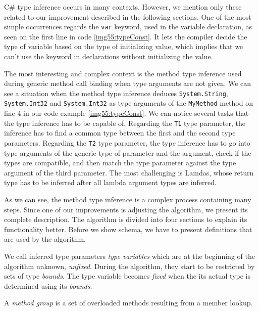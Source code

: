 C\# type inference occurs in many contexts. 
However, we mention only these related to our improvement described in the following sections. 
One of the most simple occurrences regards the \texttt{var} keyword, used in the variable declaration, as seen on the first line in code \ref{img55:typeConst}. It lets the compiler decide the type of variable based on the type of initializing value, which implies that we can’t use the keyword in declarations without initializing the value.
\par
The most interesting and complex context is the method type inference used during generic method call binding when type arguments are not given. 
We can see a situation when the method type inference deduces \texttt{System.String}, \texttt{System.Int32} and \texttt{System.Int32} as type arguments of the \texttt{MyMethod} method on line 4 in our code example \ref{img55:typeConst}. 
We can notice several tasks that the type inference has to be capable of.
Regarding the \texttt{T1} type parameter, the inference has to find a common type between the first and the second type parameters. 
Regarding the \texttt{T2} type parameter, the type inference has to go into type arguments of the generic type of parameter and the argument, check if the types are compatible, and then match the type parameter against the type argument of the third parameter. 
The most challenging is Lamdas, whose return type has to be inferred after all lambda argument types are inferred.
\par
As we can see, the method type inference is a complex process containing many steps.
Since one of our improvements is adjusting the algorithm, we present its complete description.
The algorithm is divided into four sections to explain its functionality better.
Before we show schema, we have to present definitions that are used by the algorithm.
\par
{}
\begin{defn}
We call inferred type parameters \emph{type variables} which are at the beginning of the algorithm unknown, \emph{unfixed}. 
During the algorithm, they start to be restricted by sets of type \emph{bounds}.
The type variable becomes \emph{fixed} when the its actual type is determined using its \emph{bounds}.
\end{defn}
\begin{defn}
A \emph{method group} is a set of overloaded methods resulting from a member lookup.
\end{defn}
